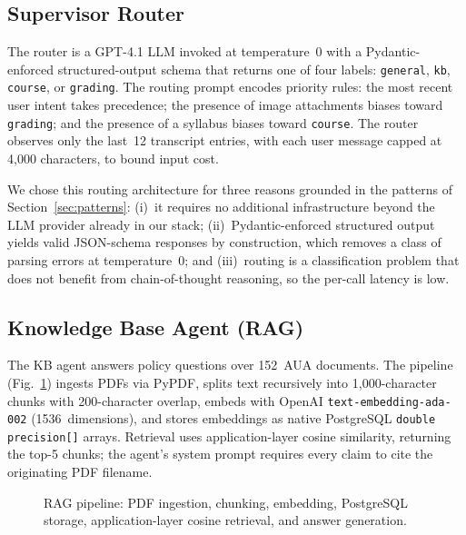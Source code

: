 \documentclass[conference]{IEEEtran}
\begin{document}
\subsection{Supervisor Router}

The router is a GPT-4.1 LLM invoked at temperature~0 with a Pydantic-enforced structured-output schema that returns one of four labels: \texttt{general}, \texttt{kb}, \texttt{course}, or \texttt{grading}. The routing prompt encodes priority rules: the most recent user intent takes precedence; the presence of image attachments biases toward \texttt{grading}; and the presence of a syllabus biases toward \texttt{course}. The router observes only the last~12 transcript entries, with each user message capped at 4{,}000 characters, to bound input cost.

We chose this routing architecture for three reasons grounded in the patterns of Section~\ref{sec:patterns}: (i)~it requires no additional infrastructure beyond the LLM provider already in our stack; (ii)~Pydantic-enforced structured output yields valid JSON-schema responses by construction, which removes a class of parsing errors at temperature~0; and (iii)~routing is a classification problem that does not benefit from chain-of-thought reasoning, so the per-call latency is low.

\subsection{Knowledge Base Agent (RAG)}

The KB agent answers policy questions over 152~AUA documents. The pipeline (Fig.~\ref{fig:rag}) ingests PDFs via PyPDF, splits text recursively into 1{,}000-character chunks with 200-character overlap, embeds with OpenAI \texttt{text-embedding-ada-002} (1536~dimensions), and stores embeddings as native PostgreSQL \texttt{double precision[]} arrays. Retrieval uses application-layer cosine similarity, returning the top-5 chunks; the agent's system prompt requires every claim to cite the originating PDF filename.

\begin{figure}[t]
\centering
{}
\caption{RAG pipeline: PDF ingestion, chunking, embedding, PostgreSQL storage, application-layer cosine retrieval, and answer generation.}
\label{fig:rag}
\end{figure}
\end{document}
